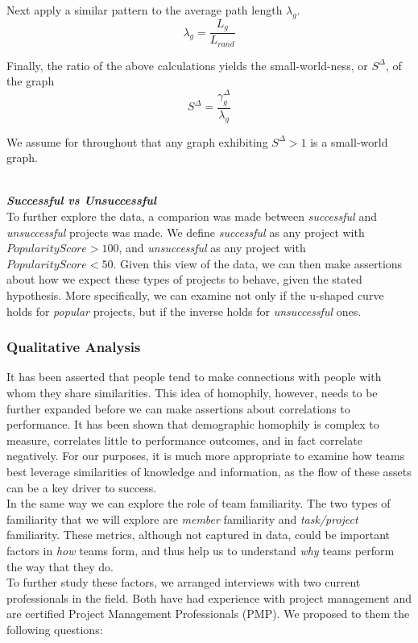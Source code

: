 \documentclass{proc}
\begin{document}
Next apply a similar pattern to the average path length $\lambda_g$.
\[\lambda_g = \frac{L_g }{L_{rand} } \]

Finally, the ratio of the above calculations yields the small-world-ness, or $S^\Delta$, of the graph
\[S^\Delta = \frac{\gamma^{\Delta}_g }{\lambda_g} \]

We assume for throughout that any graph exhibiting $S^\Delta > 1$ is a small-world graph.

\noindent\\\textit{\textbf{Successful vs Unsuccessful}}\\
To further explore the data, a comparion was made between \textit{successful} and \textit{unsuccessful} projects was made. We define \textit{successful} as any project with {$PopularityScore > 100$}, and \textit{unsuccessful} as any project with {$PopularityScore < 50$}. Given this view of the data, we can then make assertions about how we expect these types of projects to behave, given the stated hypothesis. More specifically, we can examine not only if the u-shaped curve holds for \textit{popular} projects, but if the inverse holds for \textit{unsuccessful} ones.


\subsubsection{Qualitative Analysis}
It has been asserted that people tend to make connections with people with whom they share similarities\cite{mcpherson2001birds}. This idea of homophily, however, needs to be further expanded before we can make assertions about correlations to performance. It has been shown that demographic homophily is complex to measure, correlates little to performance outcomes, and in fact correlate negatively\cite{reagans2004make,lawrence1997perspective}. For our purposes, it is much more appropriate to examine how teams best leverage similarities of knowledge and information, as the flow of these assets can be a key driver to success\cite{nissen2002extended}.\\
In the same way we can explore the role of team familiarity. The two types of familiarity that we will explore are \textit{member} familiarity and \textit{task/project} familiarity\cite{harrison2003time}. These metrics, although not captured in data, could be important factors in \textit{how} teams form, and thus help us to understand \textit{why} teams perform the way that they do.\\

To further study these factors, we arranged interviews with two current professionals in the field. Both have had experience with project management and are certified Project Management Professionals (PMP)\textregistered. We proposed to them the following questions:
\end{document}
